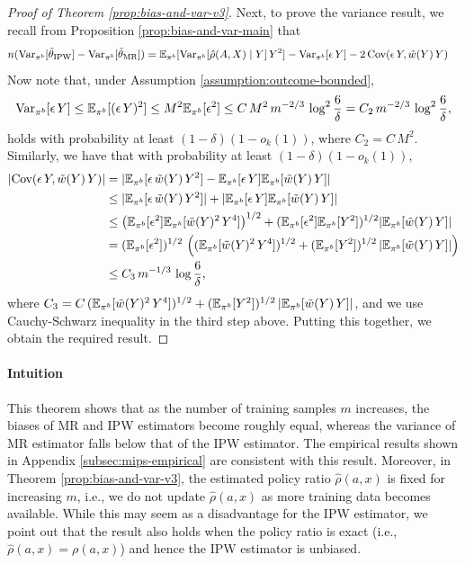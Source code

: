 \begin{proof}[Proof of Theorem \ref{prop:bias-and-var-v3}]
    Next, to prove the variance result, we recall from Proposition \ref{prop:bias-and-var-main} that
    \begin{align*}
        n (\textup{Var}_{\pi^b}[\tilde{\theta}_{\textup{IPW}}] - \textup{Var}_{\pi^b}[\tilde{\theta}_{\textup{MR}}]) &= \mathbb{E}_{\pi^b}[\textup{Var}_{\pi^b}[\hat{\rho}(A, X) \mid Y]\, Y^2] - \textup{Var}_{\pi^b}[\epsilon\,Y] - 2\,\textup{Cov}(\epsilon\,Y, \tilde{w}(Y)\,Y)
    \end{align*}
    Now note that, under Assumption \ref{assumption:outcome-bounded},
    \begin{align*}
         \textup{Var}_{\pi^b}[\epsilon\,Y]  \leq \mathbb{E}_{\pi^b}[(\epsilon\,Y)^2] \leq M^2 \mathbb{E}_{\pi^b}[\epsilon^2] \leq C\, M^2\, m^{-2/3} \, \log^2{\frac{6}{\delta}} = C_2\, m^{-2/3} \, \log^2{\frac{6}{\delta}},
    \end{align*}
    holds with probability at least $(1-\delta)(1-o_{k}(1))$, where $C_2 = C\, M^2$. Similarly, we have that with probability at least $(1-\delta)(1-o_{k}(1))$,
    \begin{align*}
        |\textup{Cov}(\epsilon\,Y, \tilde{w}(Y)\,Y)| &= |\mathbb{E}_{\pi^b}[\epsilon\,\tilde{w}(Y)\,Y^2] - \mathbb{E}_{\pi^b}[\epsilon\,Y]\mathbb{E}_{\pi^b}[\tilde{w}(Y)\,Y] |\\ 
        &\leq |\mathbb{E}_{\pi^b}[\epsilon \,\tilde{w}(Y)\,Y^2]| + |\mathbb{E}_{\pi^b}[\epsilon\,Y]\mathbb{E}_{\pi^b}[\tilde{w}(Y)\,Y]|\\
        &\leq \left(\mathbb{E}_{\pi^b}[\epsilon^2]\mathbb{E}_{\pi^b}[\tilde{w}(Y)^2\,Y^4]\right)^{1/2} + (\mathbb{E}_{\pi^b}[\epsilon^2]\mathbb{E}_{\pi^b}[Y^2])^{1/2} |\mathbb{E}_{\pi^b}[\tilde{w}(Y)\,Y]|\\
        &= (\mathbb{E}_{\pi^b}[\epsilon^2])^{1/2}\,\left( (\mathbb{E}_{\pi^b}[\tilde{w}(Y)^2\,Y^4])^{1/2} + (\mathbb{E}_{\pi^b}[Y^2])^{1/2}\,|\mathbb{E}_{\pi^b}[\tilde{w}(Y)\,Y]|\right)\\
        &\leq C_3\,m^{-1/3}\,\log{\frac{6}{\delta}},
    \end{align*}
    where $C_3 = C\,(\mathbb{E}_{\pi^b}[\tilde{w}(Y)^2\,Y^4])^{1/2} + (\mathbb{E}_{\pi^b}[Y^2])^{1/2}\,|\mathbb{E}_{\pi^b}[\tilde{w}(Y)\,Y]|$, and we use Cauchy-Schwarz inequality in the third step above. Putting this together, we obtain the required result.
\end{proof}

\paragraph{Intuition} This theorem shows that as the number of training samples $m$ increases, the biases of MR and IPW estimators become roughly equal, whereas the variance of MR estimator falls below that of the IPW estimator. The empirical results shown in Appendix \ref{subsec:mips-empirical} are consistent with this result.
Moreover, in Theorem \ref{prop:bias-and-var-v3}, the estimated policy ratio $\hat{\rho}(a, x)$ is fixed for increasing $m$, i.e., we do not update $\hat{\rho}(a, x)$ as more training data becomes available. While this may seem as a disadvantage for the IPW estimator, we point out that the result also holds when the policy ratio is exact (i.e., $\hat{\rho}(a, x) = \rho(a, x)$) and hence the IPW estimator is unbiased.

